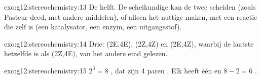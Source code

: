\begin{solution}{exo:g12:stereochemistry:13}
De helft. De scheikundige kan de twee  scheiden (zoals
Pasteur deed, met andere middelen), of alleen het nuttige 
maken, met een reactie die zelf  is (een  katalysator, een
enzym, een  uitgangsstof).
\end{solution}

\begin{solution}{exo:g12:stereochemistry:14}
Drie: (2E,4E), (2Z,4Z) en (2E,4Z), waarbij de laatste hetzelfde 
is als (2Z,4E), van het andere eind gelezen.
\end{solution}

\begin{solution}{exo:g12:stereochemistry:15}
$2^3 = 8$ , dat zijn 4 paren . Elk
 heeft één  en $8 - 2 = 6$ .
\end{solution}


